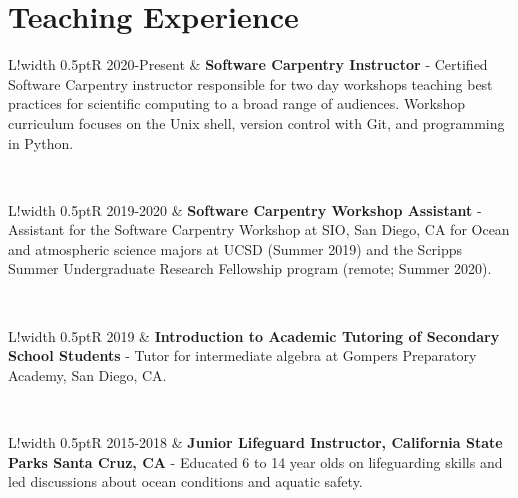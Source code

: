\documentclass[10pt]{article}
\newcommand\VRule{\color{lightgray}\vrule width 0.5pt}
\begin{document}
\section*{Teaching Experience}
\vspace{.3cm}
\begin{tabular}{L!{\VRule}R}
2020-Present & \textbf{Software Carpentry Instructor} - Certified Software Carpentry instructor responsible for two day workshops teaching best practices for scientific computing to a broad range of audiences. Workshop curriculum focuses on the Unix shell, version control with Git, and programming in Python.  \\[5pt]
\end{tabular}
\\[10pt]
\begin{tabular}{L!{\VRule}R}
2019-2020 & \textbf{Software Carpentry Workshop Assistant} - Assistant for the Software Carpentry Workshop at SIO, San Diego, CA for Ocean and atmospheric science majors at UCSD (Summer 2019) and the Scripps Summer Undergraduate Research Fellowship program (remote; Summer 2020). \\[5pt]
\end{tabular}
\\[10pt]
\begin{tabular}{L!{\VRule}R}
2019 & \textbf{Introduction to Academic Tutoring of Secondary School Students} - Tutor for intermediate algebra at Gompers Preparatory Academy, San Diego, CA. \\[5pt]
\end{tabular}
\\[10pt]
\begin{tabular}{L!{\VRule}R}
2015-2018 & \textbf{Junior Lifeguard Instructor, California State Parks Santa Cruz, CA } - Educated 6 to 14 year olds on lifeguarding skills and led discussions about ocean conditions and aquatic safety. \\[5pt]
\end{tabular}


\vspace{.3cm}
\end{document}
